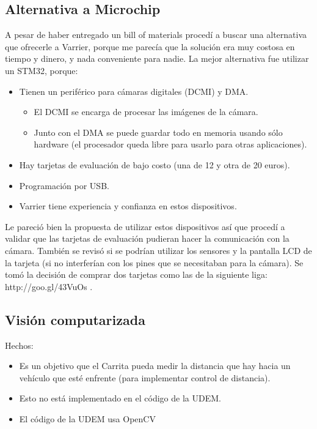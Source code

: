 \documentclass[paper=a4, fontsize=11pt]{scrartcl} %
\numberwithin{equation}{section}
\numberwithin{figure}{section}
\numberwithin{table}{section}
\begin{document}
\subsection{Alternativa a Microchip}
A pesar de haber entregado un bill of materials proced\'{i} a buscar una alternativa que ofrecerle a Varrier, porque me parec\'{i}a que la soluci\'{o}n era muy costosa en tiempo y dinero, y nada conveniente para nadie. La mejor alternativa fue utilizar un STM32, porque:
\begin{itemize}
	\item Tienen un perif\'{e}rico para c\'{a}maras digitales (DCMI) y DMA.
	\begin{itemize}
		\item El DCMI se encarga de procesar las im\'{a}genes de la c\'{a}mara.
		\item Junto con el DMA se puede guardar todo en memoria usando s\'{o}lo hardware (el procesador queda libre para usarlo para otras aplicaciones).
	\end{itemize}
	\item Hay tarjetas de evaluaci\'{o}n de bajo costo (una de 12 y otra de 20 euros).
	\item Programaci\'{o}n por USB.
	\item Varrier tiene experiencia y confianza en estos dispositivos.
\end{itemize}
Le pareci\'{o} bien la propuesta de utilizar estos dispositivos as\'{i} que proced\'{i} a validar que las tarjetas de evaluaci\'{o}n pudieran hacer la comunicaci\'{o}n con la c\'{a}mara. Tambi\'{e}n se revis\'{o} si se podr\'{i}an utilizar los sensores y la pantalla LCD de la tarjeta (si no interfer\'{i}an con los pines que se necesitaban para la c\'{a}mara). Se tom\'{o} la decisi\'{o}n de comprar dos tarjetas como las de la siguiente liga: http://goo.gl/43VuOs .

\subsection{Visi\'{o}n computarizada}
Hechos:
\begin{itemize}
	\item Es un objetivo que el Carrita pueda medir la distancia que hay hacia un veh\'{i}culo que est\'{e} enfrente (para implementar control de distancia).
	\item Esto no est\'{a} implementado en el c\'{o}digo de la UDEM.
	\item El c\'{o}digo de la UDEM usa OpenCV
\end{itemize}
\end{document}
